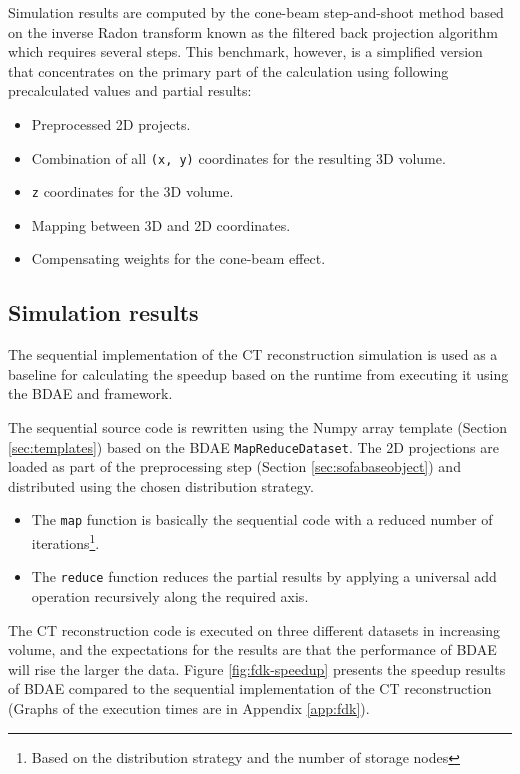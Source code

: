 \noindent
Simulation results are computed by the cone-beam step-and-shoot method based on the inverse Radon transform known as the filtered back projection algorithm which requires several steps. This benchmark, however, is a simplified version that concentrates on the primary part of the calculation using following precalculated values and partial results:

\begin{itemize}
	\item Preprocessed 2D projects.
	\item Combination of all \texttt{(x, y)} coordinates for the resulting 3D volume.
	\item \texttt{z} coordinates for the 3D volume.
	\item Mapping between 3D and 2D coordinates.
	\item Compensating weights for the cone-beam effect.
\end{itemize}

\subsection*{Simulation results}
The sequential implementation of the CT reconstruction simulation is used as a baseline for calculating the speedup based on the runtime from executing it using the BDAE and \CodeName framework.
\newpage

The sequential source code is rewritten using the Numpy array template (Section \ref{sec:templates}) based on the BDAE \texttt{MapReduceDataset}. The 2D projections are loaded as part of the preprocessing step (Section \ref{sec:sofabaseobject}) and distributed using the chosen distribution strategy.

\begin{itemize}
	\item The \texttt{map} function is basically the sequential code with a reduced number of iterations\footnote{Based on the distribution strategy and the number of storage nodes}.
	\item The \texttt{reduce} function reduces the partial results by applying a universal add operation recursively along the required axis.
\end{itemize}

The CT reconstruction code is executed on three different datasets in increasing volume, and the expectations for the results are that the performance of BDAE will rise the larger the data. Figure \ref{fig:fdk-speedup} presents the speedup results of BDAE compared to the sequential implementation of the CT reconstruction (Graphs of the execution times are in Appendix \ref{app:fdk}).


